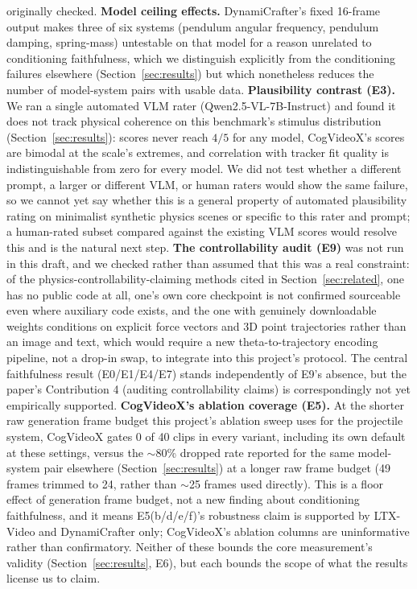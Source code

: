 originally checked. \textbf{Model
ceiling effects.} DynamiCrafter's fixed 16-frame output makes three of six
systems (pendulum angular frequency, pendulum damping, spring-mass)
untestable on that model for a reason unrelated to conditioning faithfulness, which we distinguish
explicitly from the conditioning failures elsewhere (Section~\ref{sec:results})
but which nonetheless reduces the number of model-system pairs with usable
data. \textbf{Plausibility contrast (E3).} We ran a single automated VLM rater
(Qwen2.5-VL-7B-Instruct) and found it does not track physical coherence on
this benchmark's stimulus distribution (Section~\ref{sec:results}): scores
never reach $4/5$ for any model, CogVideoX's scores are bimodal at the
scale's extremes, and correlation with tracker fit quality is
indistinguishable from zero for every model. We did not test whether a
different prompt, a larger or different VLM, or human raters would show the
same failure, so we cannot yet say whether this is a general property of
automated plausibility rating on minimalist synthetic physics scenes or
specific to this rater and prompt; a human-rated subset compared against
the existing VLM scores would resolve this and is the natural next step.
\textbf{The controllability audit (E9)} was not run in this draft, and we
checked rather than assumed that this was a real constraint: of the
physics-controllability-claiming methods cited in
Section~\ref{sec:related}, one has no public code at all, one's own core
checkpoint is not confirmed sourceable even where auxiliary code exists,
and the one with genuinely downloadable weights conditions on explicit
force vectors and 3D point trajectories rather than an image and text,
which would require a new theta-to-trajectory encoding pipeline, not a
drop-in swap, to integrate into this project's protocol. The central
faithfulness result (E0/E1/E4/E7) stands independently of E9's absence, but
the paper's Contribution 4 (auditing controllability claims) is
correspondingly not yet empirically supported. \textbf{CogVideoX's ablation
coverage (E5).} At the shorter raw generation frame budget this project's
ablation sweep uses for the projectile system, CogVideoX gates 0 of 40
clips in every variant, including its own default at these settings, versus
the $\sim$80\% dropped rate reported for the same model-system pair
elsewhere (Section~\ref{sec:results}) at a longer raw frame budget (49
frames trimmed to 24, rather than $\sim$25 frames used directly). This is a
floor effect of generation frame budget, not a new finding about
conditioning faithfulness, and it means E5(b/d/e/f)'s robustness claim is
supported by LTX-Video and DynamiCrafter only; CogVideoX's ablation columns
are uninformative rather than confirmatory. Neither of these bounds the
core measurement's validity (Section~\ref{sec:results}, E6), but each
bounds the scope of what the results license us to claim.

